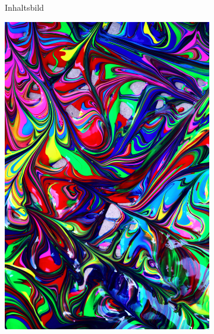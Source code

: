 \begin{figure}[H]
    \centering

    \begin{subfigure}[h]{0.21\textwidth}
        \centering
        Inhaltsbild
    \end{subfigure}
    \begin{subfigure}[h]{0.21\textwidth}
        \centering
        \includegraphics[width=\textwidth]{resources/content/style/multicolored_abstract_artwork.jpg}
    \end{subfigure}
    \begin{subfigure}[h]{0.21\textwidth}
        \centering

\end{subfigure}
\end{figure}
